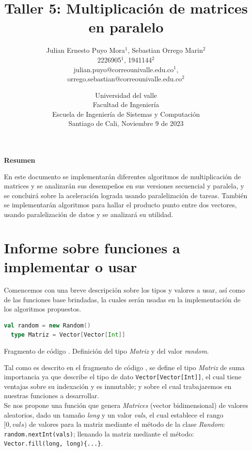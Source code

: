 \documentclass{article}
\title{\textbf{Taller 5: Multiplicación de matrices en paralelo}}
\author{Julian Ernesto Puyo Mora$^1$,
        Sebastian Orrego Marin$^2$\\        
        2226905$^1$, 1941144$^2$\\
        julian.puyo@correounivalle.edu.co$^1$,\\ 
        orrego.sebastian@correounivalle.edu.co$^2$\\}
\date{Universidad del valle\\ Facultad de Ingeniería\\ Escuela de Ingeniería de Sistemas y Computación\\
Santiago de Cali, Noviembre 9 de 2023}
\newcounter{codesnippet}
\newcommand{\newcodesnippet}{%
  \stepcounter{codesnippet}%
}
\begin{document}
\maketitle

\begin{center}
{\bf \large Resumen}\\
\end{center}

En este documento se implementarán diferentes algoritmos de multiplicación de matrices y se analizarán sus desempeños en sus versiones secuencial y paralela, y se concluirá sobre la aceleración lograda usando paralelización de tareas. También se implementarán
algoritmos para hallar el producto punto entre dos vectores, usando paralelización de
datos y se analizará su utilidad.

\section{Informe sobre funciones a implementar o usar}

Comencemos con una breve descripción sobre los tipos y valores a usar, así como de las funciones base brindadas, la cuales serán usadas en la implementación de los algoritmos propuestos.

\newcodesnippet
\begin{lstlisting}[language=Scala]
  val random = new Random()
  type Matriz = Vector[Vector[Int]]
\end{lstlisting}
\begin{center}
    \small{Fragmento de código \thecodesnippet. Definición del tipo \textit{Matriz} y del valor \textit{random}.}
\end{center}

Tal como es descrito en el fragmento de código \thecodesnippet, se define el tipo \textit{Matriz} de suma importancia ya que describe el tipo de dato \verb|Vector[Vector[Int]]|, el cual tiene ventajas sobre su indexación y es inmutable; y sobre el cual trabajaremos en nuestras funciones a desarrollar. \\

Se nos propone una función que genera \textit{Matrices} (vector bidimensional) de valores aleatorios, dado un tamaño \textit{long} y un valor \textit{vals}, el cual establece el rango \([0,vals)\) de valores para la matriz mediante el método de la clase \textit{Random}: \verb|random.nextInt(vals)|; llenando la matriz mediante el método: \verb|Vector.fill(long, long){...}|.
\end{document}
